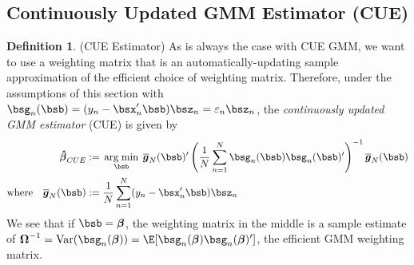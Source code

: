 \documentclass[12pt]{article}
\theoremstyle{plain}
\theoremstyle{definition}
\newtheorem{defn}[thm]{Definition}
\theoremstyle{remark}
\newcommand{\bsbeta}{\boldsymbol{\beta}}
\newcommand{\bsOmega}{\boldsymbol{\Omega}}
\newcommand{\bshatbeta}{\boldsymbol{\hat{\beta}}}
\newcommand{\bsbarg}{\boldsymbol{\overline{g}}}
\DeclareMathOperator*{\argmin}{arg\;min}
\newcommand{\Var}{\operatorname{Var}}
\newcommand{\sumnN}{\sum^N_{n=1}}
\begin{document}
\clearpage
\subsection{Continuously Updated GMM Estimator (CUE)}


\begin{defn}(CUE Estimator)
As is always the case with CUE GMM, we want to use a weighting matrix
that is an automatically-updating sample approximation of the efficient
choice of weighting matrix. Therefore, under the assumptions of this
section with
$\bsg_n(\bsb) = (y_n-\bsx_n'\bsb)\bsz_n=\varepsilon_n\bsz_n$,
the \emph{continuously updated GMM estimator} (CUE) is given by
\begin{align*}
  \bshatbeta_{CUE} :=&\;
  \argmin_{\bsb}\;
  \bsbarg_N(\bsb)'
  \left(
    \frac{1}{N}\sumnN \bsg_n(\bsb)\bsg_n(\bsb)'
  \right)^{-1}
  \bsbarg_N(\bsb) \\
  \text{where} \quad
  \bsbarg_N(\bsb) :=&\;
  \frac{1}{N} \sumnN (y_n-\bsx_n'\bsb)\bsz_n
\end{align*}
We see that if $\bsb=\bsbeta$, the weighting matrix in the middle is a
sample estimate of
$\bsOmega^{-1}=\Var(\bsg_n(\bsbeta))=\E[\bsg_n(\bsbeta)\bsg_n(\bsbeta)']$,
the efficient GMM weighting matrix.
\end{defn}
\end{document}
